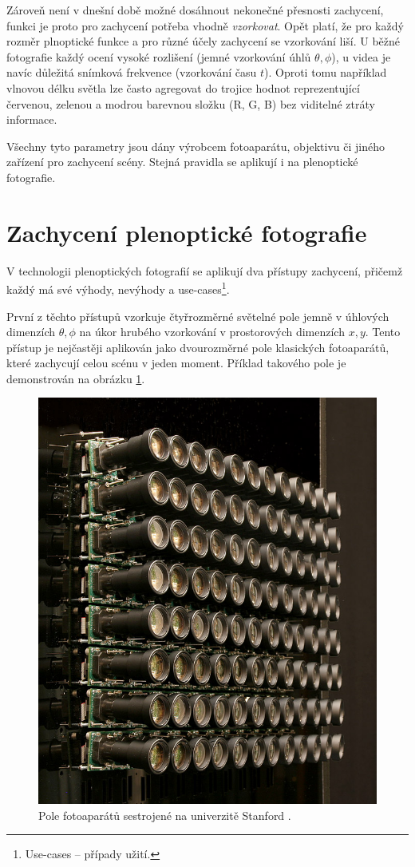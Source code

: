 Zároveň není v dnešní době možné dosáhnout nekonečné přesnosti zachycení, funkci je proto pro zachycení potřeba vhodně \textit{vzorkovat}.
Opět platí, že pro každý rozměr plnoptické funkce a pro různé účely zachycení se vzorkování liší.
U běžné fotografie každý ocení vysoké rozlišení (jemné vzorkování úhlů $\theta, \phi$), u videa je navíc důležitá snímková frekvence (vzorkování času $t$).
Oproti tomu například vlnovou délku světla lze často agregovat do trojice hodnot reprezentující červenou, zelenou a modrou barevnou složku (R, G, B) bez viditelné ztráty informace.

Všechny tyto parametry jsou dány výrobcem fotoaparátu, objektivu či jiného zařízení pro zachycení scény.
Stejná pravidla se aplikují i na plenoptické fotografie.

\section{Zachycení plenoptické fotografie}
V technologii plenoptických fotografií se aplikují dva přístupy zachycení, přičemž každý má své výhody, nevýhody a use-cases\footnote{Use-cases -- případy užití.}.

První z těchto přístupů vzorkuje čtyřrozměrné světelné pole jemně v úhlových dimenzích $\theta, \phi$ na úkor hrubého vzorkování v prostorových dimenzích $x, y$.
Tento přístup je nejčastěji aplikován jako dvourozměrné pole klasických fotoaparátů, které zachycují celou scénu v jeden moment.
Příklad takového pole je demonstrován na obrázku \ref{stanfordArray}.

\label{light-field-capture}
\begin{figure}[h]
  \centering
  \includegraphics[width=.4\textwidth]{obrazky-figures/stanford-array.jpg}
	\caption{Pole fotoaparátů sestrojené na univerzitě Stanford \cite{stanford}.}
	\label{stanfordArray}
\end{figure}

